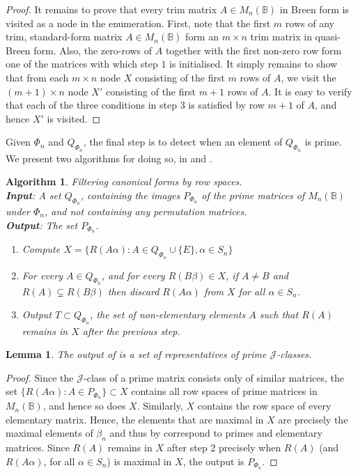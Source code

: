 \documentclass[11pt]{article}
\newtheorem{lemma}[thm]{Lemma}
\newtheorem{algo}[thm]{Algorithm}
\newenvironment{alg}{\begin{algo}\rm}{\end{algo}}
\numberwithin{equation}{section}
\newcommand{\set}[2]{\ensuremath{\{#1 : #2 \}}}
\newcommand{\B}{\mathbb{B}}
\newcommand{\Bn}{M_n(\B)}
\newcommand{\J}{\mathscr{J}}
\begin{document}
\begin{proof}
  It remains to prove that every trim matrix $A \in \Bn$ in Breen form is
  visited as a node in the enumeration. First, note that the first $m$ rows of
  any trim, standard-form matrix $A \in \Bn$ form an $m \times n$ trim matrix in
  quasi-Breen form. Also, the zero-rows of $A$ together with the first
  non-zero row form one of the matrices with which step $1$ is initialised. It
  simply remains to show that from each $m \times n$ node $X$ consisting of the
  first $m$ rows of $A$, we visit the $(m + 1)\times n$ node $X'$ consisting of
  the first $m + 1$ rows of $A$. It is easy to verify that each of the three
  conditions in step $3$ is satisfied by row $m + 1$ of $A$, and hence $X'$ is
  visited.
\end{proof}

Given $\Phi_n$ and $Q_{\Phi_n}$, the final step is to detect when an element of
$Q_{\Phi_n}$ is prime. We present two algorithms for doing so, in
 and .

\begin{alg}
  Filtering canonical forms by row spaces.\\
  \textbf{Input}: A set $Q_{\Phi_n}$, containing the images $P_{\Phi_n}$ of the
  prime matrices of $\Bn$ under $\Phi_n$, and not containing any permutation
  matrices. \\
  \textbf{Output}: The set $P_{\Phi_n}$.
  \begin{enumerate}
  \item 
    Compute $X = \set{R(A\alpha)}{A \in Q_{\Phi_n} \cup \{E\}, \alpha \in S_n}$
  \item
    For every $A \in Q_{\Phi_n}$, and for every $R(B\beta) \in X$, if $A \neq B$ and
    $R(A) \subsetneq R(B\beta)$ then discard $R(A\alpha)$ from $X$ for all
    $\alpha \in S_n$.
  \item
    Output $T\subset Q_{\Phi_n}$, the set of non-elementary elements $A$ such that $R(A)$
    remains in $X$ after the previous step.
  \end{enumerate}
\end{alg}

\begin{lemma}
  The output of  is a set of representatives of prime
  $\J$-classes.
\end{lemma}
\begin{proof}
  Since the $\J$-class of a prime matrix consists only of similar matrices, the
  set $\set{R(A\alpha)}{A \in P_{\Phi_n}} \subset X$ contains all row spaces of
  prime matrices in $\Bn$, and hence so does $X$. Similarly, $X$ contains the
  row space of every elementary matrix. Hence, the elements that are maximal in
  $X$ are precisely the maximal elements of $\beta_n$ and thus by
   correspond to primes and elementary matrices.
  Since $R(A)$ remains in $X$ after step 2 precisely when $R(A)$ (and
  $R(A\alpha)$, for all $\alpha \in S_n$) is maximal in $X$, the output is
  $P_{\Phi_n}$.
\end{proof} 
\end{document}

